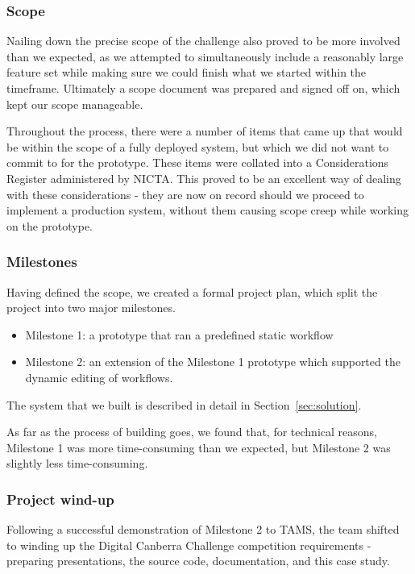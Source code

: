 \documentclass[12pt,a4paper,twosided]{article}
\begin{document}
\subsubsection{Scope}

Nailing down the precise scope of the challenge also proved to be more
involved than we expected, as we attempted to simultaneously include a
reasonably large feature set while making sure we could finish what we
started within the timeframe. Ultimately a scope document was prepared
and signed off on, which kept our scope manageable.

Throughout the process, there were a number of items that came up that
would be within the scope of a fully deployed system, but which we did
not want to commit to for the prototype. These items were collated into
a Considerations Register administered by NICTA. This proved to be an
excellent way of dealing with these considerations - they are now on
record should we proceed to implement a production system, without them
causing scope creep while working on the prototype.

\subsubsection{Milestones}

Having defined the scope, we created a formal project plan, which split
the project into two major milestones.

\begin{itemize}

\item
  Milestone 1: a prototype that ran a predefined static workflow
\item
  Milestone 2: an extension of the Milestone 1 prototype which supported
  the dynamic editing of workflows.
\end{itemize}

The system that we built is described in detail in Section~\ref{sec:solution}. 

As far as the
process of building goes, we found that, for technical reasons,
Milestone 1 was more time-consuming than we expected, but Milestone 2
was slightly less time-consuming.

\subsubsection{Project wind-up}

Following a successful demonstration of Milestone 2 to TAMS, the team
shifted to winding up the Digital Canberra Challenge competition
requirements - preparing presentations, the source code, documentation,
and this case study.
\end{document}
